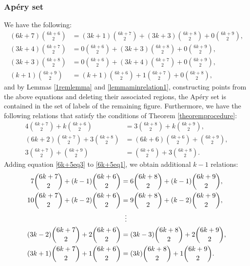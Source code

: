 \documentclass[12pt]{article}
\theoremstyle{remark}
\begin{document}
\subsubsection{Ap{\'e}ry set}
We have the following:
\begin{align}
    (6k+7)\binom{6k+6}{2} &= (3k+1)\binom{6k+7}{2} + (3k+3)\binom{6k+8}{2} + 0\binom{6k+9}{2}, \label{6k+5minrelation0} \\
    (3k+4)\binom{6k+7}{2} &= 0\binom{6k+6}{2} + (3k+3)\binom{6k+8}{2} + 0\binom{6k+9}{2}, \label{6k+5minrelation1} \\
    (3k+3)\binom{6k+8}{2} &= 0\binom{6k+6}{2} + (3k+4)\binom{6k+7}{2} + 0\binom{6k+9}{2}, \label{6k+5minrelation2} \\
    (k+1)\binom{6k+9}{2} &= (k+1)\binom{6k+6}{2} + 1\binom{6k+7}{2} + 0\binom{6k+8}{2}, \label{6k+5minrelation3} 
\end{align}
and by Lemmas \ref{1remlemma} and \ref{lemmaminrelation1}, constructing points from the above equations and deleting their associated regions, the Ap{\'e}ry set is contained in the set of labels of the remaining figure.
Furthermore, we have the following relations that satisfy the conditions of Theorem \ref{theoremprocedure}:
\begin{align}
      4 \binom{6k+7}{2} + k \binom{6k+6}{2} &= 3\binom{6k+8}{2} + k\binom{6k+9}{2}, \label{6k+5eq1}\\
  (6k+2)\binom{6k+7}{2} + 3\binom{6k+8}{2}  &= (6k+6)\binom{6k+6}{2} +  \binom{6k+9}{2}, \label{6k+5eq2}\\
     3\binom{6k+7}{2} + \binom{6k+9}{2} &= \binom{6k+6}{2} + 3 \binom{6k+8}{2}. \label{6k+5eq3} 
\end{align}
Adding equation \eqref{6k+5eq3} to \eqref{6k+5eq1}, we obtain additional $k-1$ relations:
\begin{equation}\label{6k+5_k-1equations_1}
\begin{aligned}    
 7 \binom{6k+7}{2} + (k-1) \binom{6k+6}{2} &= 6\binom{6k+8}{2} + (k-1)\binom{6k+9}{2},\\
10 \binom{6k+7}{2} + (k-2) \binom{6k+6}{2} &= 9\binom{6k+8}{2} + (k-2)\binom{6k+9}{2},\\
 & \hspace{5.6pt}  \vdots      \\
(3k-2) \binom{6k+7}{2} + 2 \binom{6k+6}{2} &= (3k-3)\binom{6k+8}{2} + 2\binom{6k+9}{2}, \\
(3k+1) \binom{6k+7}{2} + 1 \binom{6k+6}{2} &= (3k)\binom{6k+8}{2} + 1\binom{6k+9}{2}.
\end{aligned}
\end{equation}
\end{document}
